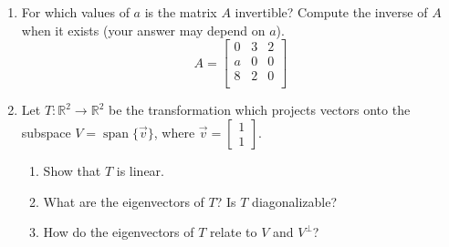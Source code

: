 \documentclass[red]{tutorial}
\newcommand{\R}{\mathbb{R}}
\newcommand{\mat}[1]{\begin{bmatrix} #1 %
\end{bmatrix}}
\DeclareMathOperator{\Span} {span}
\theoremstyle{definition}
\theoremstyle{theorem}
\begin{document}
\begin{tutorial}
\begin{enumerate}
    \item %
      For which values of $a$ is the matrix $A$ invertible? 
      Compute the inverse of $A$ when it exists 
      (your answer may depend on $a$).
      \begin{equation*}
        A = 
        \begin{bmatrix}
          0 & 3 & 2 \\
          a & 0 & 0 \\
          8 & 2 & 0 \\
        \end{bmatrix}
      \end{equation*}
    \item
      Let $T\colon\R^2\to\R^2$ be the transformation which projects vectors
      onto the subspace $V=\Span\{\vec v\}$, where $\vec v = \mat{1\\1}$.
      \begin{enumerate}
        \item 
          Show that $T$ is linear.
        \item
          What are the eigenvectors of $T$? Is $T$ diagonalizable?
        \item
          How do the eigenvectors of $T$ relate to $V$ and $V^\perp$?
      \end{enumerate}
  \end{enumerate}
\end{tutorial}
\end{document}
